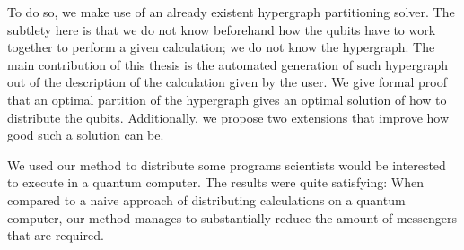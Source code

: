 To do so, we make use of an already existent hypergraph partitioning solver. The subtlety here is that we do not know beforehand how the qubits have to work together to perform a given calculation; we do not know the hypergraph. The main contribution of this thesis is the automated generation of such hypergraph out of the description of the calculation given by the user. We give formal proof that an optimal partition of the hypergraph gives an optimal solution of how to distribute the qubits. Additionally, we propose two extensions that improve how good such a solution can be. %

We used our method to distribute some programs scientists would be interested to execute in a quantum computer. The results were quite satisfying: When compared to a naive approach of distributing calculations on a quantum computer, our method manages to substantially reduce the amount of messengers that are required.